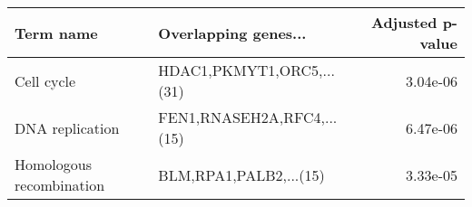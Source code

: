 \begin{tabular}{llr}
\toprule
               Term name &       Overlapping genes... &  Adjusted p-value \\
\midrule
              Cell cycle &  HDAC1,PKMYT1,ORC5,...(31) &          3.04e-06 \\
         DNA replication & FEN1,RNASEH2A,RFC4,...(15) &          6.47e-06 \\
Homologous recombination &     BLM,RPA1,PALB2,...(15) &          3.33e-05 \\
\bottomrule
\end{tabular}
